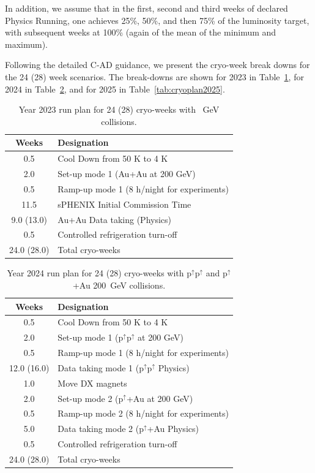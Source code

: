 In addition, we assume that in the first, second and third weeks of declared Physics Running, one achieves 25\%, 50\%, and then 75\% of the luminosity target, with subsequent weeks at 100\% (again of the mean of the minimum and maximum).

Following the detailed C-AD guidance, we present the cryo-week break downs for the 24 (28) week scenarios.   
The break-downs are shown for 2023 in Table~\ref{tab:cryoplan2023}, for 2024 in Table~\ref{tab:cryoplan2024}, and for
2025 in Table~\ref{tab:cryoplan2025}.

\begin{table}
\centering
\begin{tabular}{ | c | l | }
\hline
Weeks & Designation \\ \hline
0.5  & Cool Down from 50 K to 4 K \\ \hline
2.0  & Set-up mode 1 (Au+Au at 200 GeV) \\ \hline
0.5  & Ramp-up mode 1 (8 h/night for experiments) \\ \hline
11.5  & sPHENIX Initial Commission Time \\ \hline
9.0 (13.0) & Au+Au Data taking (Physics) \\ \hline
0.5  & Controlled refrigeration turn-off \\ \hline \hline \hline
24.0 (28.0) & Total cryo-weeks \\
\hline
\end{tabular}
\caption{Year 2023 run plan for 24 (28) cryo-weeks with ~GeV collisions.\label{tab:cryoplan2023}}
\end{table}

\begin{table}
\centering
\begin{tabular}{ | c | l | }
\hline
Weeks & Designation \\ \hline
0.5  & Cool Down from 50 K to 4 K \\ \hline
2.0  & Set-up mode 1 (p$^{\uparrow}$p$^{\uparrow}$ at 200 GeV) \\ \hline
0.5  & Ramp-up mode 1 (8 h/night for experiments) \\ \hline
12.0 (16.0) & Data taking mode 1 (p$^{\uparrow}$p$^{\uparrow}$ Physics) \\ \hline
1.0  & Move DX magnets \\ \hline
2.0  & Set-up mode 2 (p$^{\uparrow}$+Au at 200 GeV) \\ \hline
0.5  & Ramp-up mode 2 (8 h/night for experiments) \\ \hline
5.0 & Data taking mode 2 (p$^{\uparrow}$+Au Physics) \\ \hline
0.5  & Controlled refrigeration turn-off \\ \hline \hline \hline
24.0 (28.0) & Total cryo-weeks \\
\hline
\end{tabular}
\caption{Year 2024 run plan for 24 (28) cryo-weeks with p$^{\uparrow}$p$^{\uparrow}$ and p$^{\uparrow}$+Au 200~GeV collisions.\label{tab:cryoplan2024}}
\end{table}

